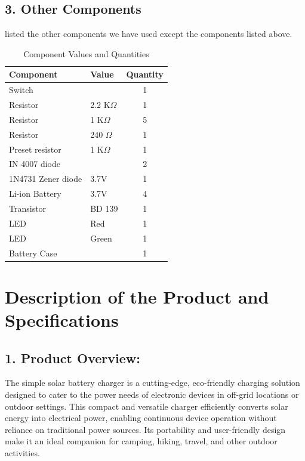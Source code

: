 \documentclass[twocolumn]{article}
\begin{document}
\subsection*{3. Other Components}
listed the other components we have used except the components listed above.
\vspace{5pt}

\begin{table}[ht]
    \centering
    \caption{Component Values and Quantities}
    \begin{tabular}{|l|l|c|}
        \hline
        \textbf{Component} & \textbf{Value} & \textbf{Quantity} \\
        \hline
        Switch & & 1 \\
        \hline
        Resistor & 2.2 K$\Omega$ & 1 \\
        \hline
        Resistor & 1 K$\Omega$ & 5 \\
        \hline
        Resistor & 240 $\Omega$ & 1 \\
        \hline
        Preset resistor & 1 K$\Omega$ & 1 \\
        \hline
        IN 4007 diode & & 2 \\
        \hline
        1N4731 Zener diode & 3.7V & 1 \\
        \hline
        Li-ion Battery & 3.7V & 4 \\
        \hline
        Transistor & BD 139 & 1 \\
        \hline
        LED & Red & 1 \\
        \hline
        LED & Green & 1 \\
        \hline
        Battery Case & & 1 \\
        \hline
    \end{tabular}
\end{table}

\section*{Description of the Product and Specifications}

\subsection*{1. Product Overview:}
The simple solar battery charger is a cutting-edge, eco-friendly charging solution designed to cater to the power needs of electronic devices in off-grid locations or outdoor settings. This compact and versatile charger efficiently converts solar energy into electrical power, enabling continuous device operation without reliance on traditional power sources. Its portability and user-friendly design make it an ideal companion for camping, hiking, travel, and other outdoor activities.
\vspace{1pt}
\end{document}
